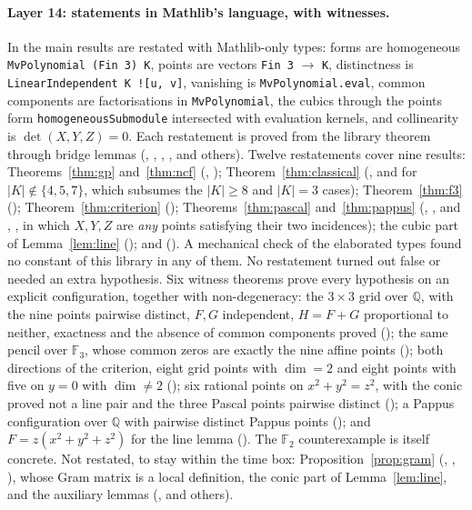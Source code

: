 \documentclass[11pt]{article}
\theoremstyle{definition}
\theoremstyle{remark}
\newcommand{\lean}[1]{\texttt{#1}}
\newcommand{\F}{\mathbb{F}}
\begin{document}
\paragraph{Layer 14: statements in Mathlib's language, with witnesses.}
In  the main results are restated with Mathlib-only types: forms are
homogeneous \lean{MvPolynomial (Fin 3) K}, points are vectors \lean{Fin 3} $\to$ \lean{K}, distinctness is
\lean{LinearIndependent K ![u, v]}, vanishing is \lean{MvPolynomial.eval}, common components are
factorisations in \lean{MvPolynomial}, the cubics through the points form
\lean{homogeneousSubmodule} intersected with evaluation kernels, and collinearity is
$\det(X,Y,Z)=0$. Each restatement is proved from the library theorem through bridge lemmas
(, , , ,  and
others). Twelve restatements cover nine results: Theorems~\ref{thm:gp} and~\ref{thm:ncf}
(, );
Theorem~\ref{thm:classical} (, and
 for $|K|\notin\{4,5,7\}$, which subsumes the $|K|\ge8$ and
$|K|=3$ cases); Theorem~\ref{thm:f3} (); Theorem~\ref{thm:criterion}
(); Theorems~\ref{thm:pascal} and~\ref{thm:pappus} (,
, and , , in which $X,Y,Z$ are
\emph{any} points satisfying their two incidences); the cubic part of Lemma~\ref{lem:line}
(); and  ().
A mechanical check of the elaborated types found no constant of this library in any of them. No
restatement turned out false or needed an extra hypothesis. Six witness theorems prove every hypothesis
on an explicit configuration, together with non-degeneracy: the $3\times3$ grid over $\mathbb{Q}$, with
the nine points pairwise distinct, $F,G$ independent, $H=F+G$ proportional to neither, exactness and the
absence of common components proved (); the same pencil over $\F_3$, whose
common zeros are exactly the nine affine points (); both directions of
the criterion, eight grid points with $\dim=2$ and eight points with five on $y=0$ with $\dim\ne2$
(); six rational points on $x^2+y^2=z^2$, with the conic proved not a line
pair and the three Pascal points pairwise distinct (); a Pappus configuration over
$\mathbb{Q}$ with pairwise distinct Pappus points (); and $F=z(x^2+y^2+z^2)$ for the
line lemma (). The $\F_2$ counterexample is itself concrete. Not restated, to stay
within the time box: Proposition~\ref{prop:gram} (, ,
), whose Gram matrix is a local definition, the conic part of
Lemma~\ref{lem:line}, and the auxiliary lemmas (,  and others).
\end{document}
